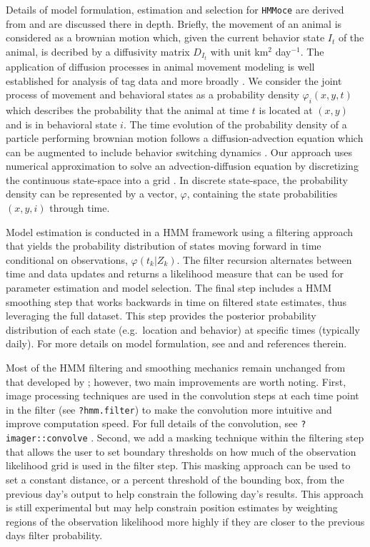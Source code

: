 Details of model formulation, estimation and selection for
\texttt{HMMoce} are derived from \citet{Pedersen2011} and are discussed
there in depth. Briefly, the movement of an animal is considered as a
brownian motion which, given the current behavior state $I_t$ of the
animal, is decribed by a diffusivity matrix $D_{I_t}$ with unit
km$^2$ day$^{-1}$. The application of
diffusion processes in animal movement modeling is well established for
analysis of tag data \citep[e.g.][]{Sibert2003, Pedersen2008} and more
broadly \citep{Okubo2013}. We consider the joint process of movement and
behavioral states as a probability density $\varphi_i(x,y,t)$ which
describes the probability that the animal at time $t$ is located at
$(x, y)$ and is in behavioral state $i$. The time evolution of the
probability density of a particle performing brownian motion follows a
diffusion-advection equation which can be augmented to include behavior
switching dynamics \citep[see Eqn. 1,][]{Pedersen2011a}. Our approach
uses numerical approximation to solve an advection-diffusion equation by
discretizing the continuous state-space into a grid
\citep{Thygesen2009a}. In discrete state-space, the probability density
can be represented by a vector, $\varphi$, containing the state
probabilities $(x,y,i)$ through time.

Model estimation is conducted in a HMM framework using a filtering
approach \citep{Zucchini2009} that yields the probability distribution
of states moving forward in time conditional on observations,
$\varphi(t_k | Z_k)$. The filter recursion alternates between time and
data updates and returns a likelihood measure that can be used for
parameter estimation and model selection. The final step includes a HMM
smoothing step \citep{Thygesen2009a} that works backwards in time on
filtered state estimates, thus leveraging the full dataset. This step
provides the posterior probability distribution of each state
(e.g.~location and behavior) at specific times (typically daily). For
more details on model formulation, see \citet{Pedersen2008} and
\citet{Pedersen2011a} and references therein.

Most of the HMM filtering and smoothing mechanics remain unchanged from
that developed by \citet{Pedersen2008}; however, two main improvements
are worth noting. First, image processing techniques are used in the
convolution steps at each time point in the filter (see
\texttt{?hmm.filter}) to make the convolution more intuitive and improve
computation speed. For full details of the convolution, see
\texttt{?imager::convolve} \citep{Barthelme2016}. Second, we add a
masking technique within the filtering step that allows the user to set
boundary thresholds on how much of the observation likelihood grid is
used in the filter step. This masking approach can be used to set a
constant distance, or a percent threshold of the bounding box, from the
previous day's output to help constrain the following day's results.
This approach is still experimental but may help constrain position
estimates by weighting regions of the observation likelihood more highly
if they are closer to the previous days filter probability.

